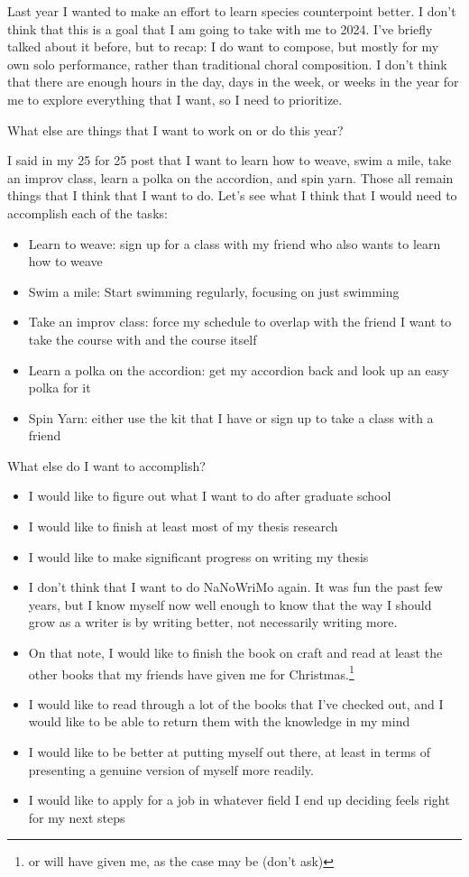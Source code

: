 \documentclass[12pt]{article}[titlepage]
\renewcommand{\,}{\textsuperscript{,}}
\begin{document}
Last year I wanted to make an effort to learn species counterpoint better.
I don't think that this is a goal that I am going to take with me to 2024.
I've briefly talked about it before, but to recap: I do want to compose, but mostly for my own solo performance, rather than traditional choral composition.
I don't think that there are enough hours in the day, days in the week, or weeks in the year for me to explore everything that I want, so I need to prioritize.

What else are things that I want to work on or do this year?

I said in my 25 for 25 post that I want to learn how to weave, swim a mile, take an improv class, learn a polka on the accordion, and spin yarn.
Those all remain things that I think that I want to do.
Let's see what I think that I would need to accomplish each of the tasks:
\begin{itemize}
\item Learn to weave: sign up for a class with my friend who also wants to learn how to weave
\item Swim a mile: Start swimming regularly, focusing on just swimming
\item Take an improv class: force my schedule to overlap with the friend I want to take the course with and the course itself
\item Learn a polka on the accordion: get my accordion back and look up an easy polka for it
\item Spin Yarn: either use the kit that I have or sign up to take a class with a friend
\end{itemize}

What else do I want to accomplish?
\begin{itemize}
\item I would like to figure out what I want to do after graduate school
\item I would like to finish at least most of my thesis research
\item I would like to make significant progress on writing my thesis
\item I don't think that I want to do NaNoWriMo again. It was fun the past few years, but I know myself now well enough to know that the way I should grow as a writer is by writing better, not necessarily writing more.
\item On that note, I would like to finish the book on craft and read at least the other books that my friends have given me for Christmas.\footnote{or will have given me, as the case may be (don't ask)}
\item I would like to read through a lot of the books that I've checked out, and I would like to be able to return them with the knowledge in my mind
\item I would like to be better at putting myself out there, at least in terms of presenting a genuine version of myself more readily.
\item I would like to apply for a job in whatever field I end up deciding feels right for my next steps
\end{itemize}
\end{document}
